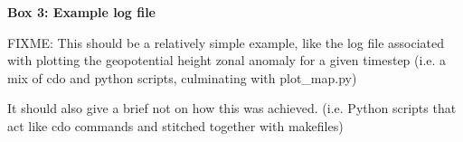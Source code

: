 \textbf{Box 3: Example log file}

FIXME: This should be a relatively simple example, like the log file associated with plotting the geopotential height zonal anomaly for a given timestep (i.e. a mix of cdo and python scripts, culminating with plot_map.py)

It should also give a brief not on how this was achieved. (i.e. Python scripts that act like cdo commands and stitched together with makefiles)